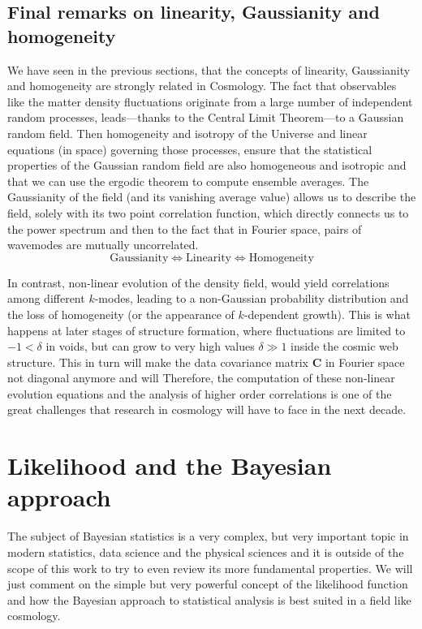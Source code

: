 \subsection{Final remarks on linearity, Gaussianity and homogeneity}

We have seen in the previous sections, that the concepts of linearity, Gaussianity and homogeneity
are strongly related in Cosmology.
The fact that observables like the matter density fluctuations originate from a large number 
of independent random processes, leads---thanks to the Central Limit Theorem---to a Gaussian random field.
Then homogeneity and isotropy of the Universe and linear equations (in space) governing those processes, ensure that the statistical properties of the Gaussian random field
are also homogeneous and isotropic and that we can use the ergodic theorem to compute ensemble averages.
The Gaussianity of the field (and its vanishing average value) allows us to describe the field, solely with its two
point correlation function, which directly connects us to the power spectrum and then to the fact that in Fourier space, 
pairs of wavemodes are mutually uncorrelated.
\begin{equation}
\textrm{Gaussianity}\Leftrightarrow\textrm{Linearity}\Leftrightarrow\textrm{Homogeneity}
\end{equation}

In contrast, non-linear evolution of the density field, would yield correlations among different $k$-modes, 
leading to a non-Gaussian probability distribution and the loss of homogeneity (or the appearance of $k$-dependent growth).
This is what happens at later stages of structure formation, 
where fluctuations are limited to $-1 < \delta$ in voids, 
but can grow to very high values $\delta \gg 1$ inside the cosmic web structure.
This in turn will make  the data covariance matrix $\mathbf{C}$ in Fourier space not diagonal anymore and 
will 
Therefore, the computation
of these non-linear evolution equations 
and the analysis of higher order correlations is one of the great challenges that research in cosmology 
will have to face in the next decade.


\section{Likelihood and the Bayesian approach}

The subject of Bayesian statistics is a very complex, but very important topic in modern
statistics, data science and the physical sciences \cite{cite Gregory and others}
and it is outside of the scope of this work to try to even review its more fundamental properties.
We will just comment on the simple but very powerful concept of the likelihood function and how the Bayesian
approach to statistical analysis is best suited in a field like cosmology.

